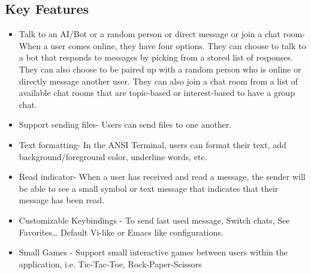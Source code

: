 \documentclass[a4paper]{article}
\begin{document}
    \subsection{Key Features}
    \begin{itemize}
        \item Talk to an AI/Bot or a random person or direct message or join a
            chat room- When a user comes online, they have four options. They
            can choose to talk to a bot that responds to messages by picking
            from a stored list of responses. They can also choose to be paired
            up with a random person who is online or directly message another
            user. They can also join a chat room from a list of available chat
            rooms that are topic-based or interest-based to have a group chat.

        \item Support sending files- Users can send files to one another.

        \item Text formatting- In the ANSI Terminal, users can format their
            text, add background/foreground color, underline words, etc.

        \item Read indicator- When a user has received and read a message, the
            sender will be able to see a small symbol or text message that
            indicates that their message has been read.

        \item Customizable Keybindings - To send last used message, Switch
            chats, See Favorites… Default Vi-like or Emacs like configurations.

        \item Small Games - Support small interactive games between users within
            the application, i.e. Tic-Tac-Toe, Rock-Paper-Scissors
    \end{itemize}
\end{document}

